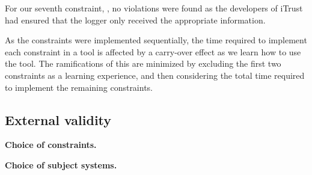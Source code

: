 For our seventh constraint, , no violations were found as the developers of iTrust had ensured that the logger only received the appropriate information. 

As the constraints were implemented sequentially, the time required to implement each constraint in a tool is affected by a carry-over effect as we learn how to use the tool. The ramifications of this are minimized by excluding the first two constraints as a learning experience, and then considering the total time required to implement the remaining constraints.

\subsection{External validity}

\textbf{Choice of constraints.} 

\textbf{Choice of subject systems.} 

